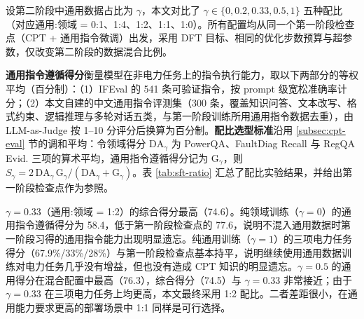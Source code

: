 \documentclass[fontset=fandol,type=master,campus=shenzhen,etitleauto=true]{hithesisbook}
\begin{document}
设第二阶段中通用数据占比为 $\gamma$，本文对比了 $\gamma \in \{0, 0.2, 0.33, 0.5, 1\}$ 五种配比（对应通用:领域 = 0:1、1:4、1:2、1:1、1:0）。所有配置均从同一个第一阶段检查点（CPT + 通用指令微调）出发，采用 DFT 目标、相同的优化步数预算与超参数，仅改变第二阶段的数据混合比例。

\textbf{通用指令遵循得分}衡量模型在非电力任务上的指令执行能力，取以下两部分的等权平均（百分制）：（1）IFEval\cite{ref85} 的 541 条可验证指令，按 prompt 级宽松准确率计分；（2）本文自建的中文通用指令评测集（300 条，覆盖知识问答、文本改写、格式约束、逻辑推理与多轮对话五类，与第一阶段训练所用通用指令数据去重），由 LLM-as-Judge 按 1--10 分评分后换算为百分制。\textbf{配比选型标准}沿用 \ref{subsec:cpt-eval} 节的调和平均：令领域得分 $\text{DA}_\gamma$ 为 PowerQA、FaultDiag Recall 与 RegQA Evid. 三项的算术平均，通用指令遵循得分记为 $\text{G}_\gamma$，则 $S_\gamma = 2\,\text{DA}_\gamma\,\text{G}_\gamma / (\text{DA}_\gamma + \text{G}_\gamma)$。表 \ref{tab:sft-ratio} 汇总了配比实验结果，并给出第一阶段检查点作为参照。

\begin{table}[htbp]
\centering
\caption{SFT 第二阶段通用-领域数据配比实验结果}
\label{tab:sft-ratio}
\small
\setlength{\tabcolsep}{4pt}
\end{table}

$\gamma = 0.33$（通用:领域 = 1:2）的综合得分最高（74.6）。纯领域训练（$\gamma = 0$）的通用指令遵循得分为 58.4，低于第一阶段检查点的 77.6，说明不混入通用数据时第一阶段习得的通用指令能力出现明显遗忘。纯通用训练（$\gamma = 1$）的三项电力任务得分（67.9\%/33\%/28\%）与第一阶段检查点基本持平，说明继续使用通用数据训练对电力任务几乎没有增益，但也没有造成 CPT 知识的明显遗忘。$\gamma = 0.5$ 的通用得分在混合配置中最高（76.3），综合得分（74.5）与 $\gamma = 0.33$ 非常接近；由于 $\gamma = 0.33$ 在三项电力任务上均更高，本文最终采用 1:2 配比。二者差距很小，在通用能力要求更高的部署场景中 1:1 同样是可行选择。
\end{document}
